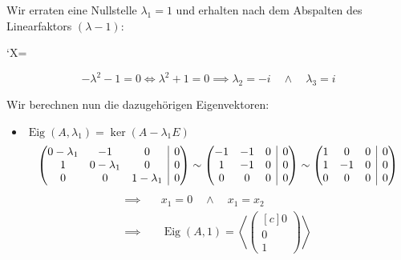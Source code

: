 \documentclass[answers]{exam}
\makeatletter
\newenvironment{sysmatrix}[1]
  {\left(\begin{array}{@{}#1@{}}}
  {\end{array}\right)}
\newcommand{\scalarprod}[1]{\left\langle #1 \right\rangle}
\newcommand{\vektor}[1]{\begin{pmatrix*}[c] #1 \end{pmatrix*}}
\newcommand{\Eig}{\operatorname{Eig}}
\makeatother
\begin{document}
\begin{questions}
\begin{parts}
\begin{solution}
            Wir erraten eine Nullstelle $\lambda_1 = 1$ und erhalten nach dem Abspalten des Linearfaktors $(\lambda-1)$:

            \vspace{1em}
            \begin{center}
                \begingroup\mathcode`X=\lambda
                \endgroup
            \end{center}

            $$
                -\lambda^2-1 = 0 \iff \lambda^2 + 1 = 0 \implies \lambda_2 = -i \quad \land \quad \lambda_3 = i
            $$

            Wir berechnen nun die dazugehörigen Eigenvektoren:
            \begin{itemize}
                \item $\Eig(A, \lambda_1) = \ker(A-\lambda_1 E)$
                      $$
                          \begin{sysmatrix}{ccc|c}
                              0 -\lambda_1 & -1 & 0 & 0 \\
                              1 & 0 -\lambda_1  & 0 & 0 \\
                              0 & 0 & 1 -\lambda_1  & 0
                          \end{sysmatrix}
                          \sim
                          \begin{sysmatrix}{ccc|c}
                              -1 & -1 & 0 & 0 \\
                              1 & -1  & 0 & 0 \\
                              0 & 0 & 0  & 0
                          \end{sysmatrix}
                          \sim
                          \begin{sysmatrix}{ccc|c}
                              1 & 0 & 0 & 0 \\
                              1 & -1  & 0 & 0 \\
                              0 & 0 & 0  & 0
                          \end{sysmatrix}
                      $$
                      $$
                          \begin{aligned}
                              \implies & \quad x_1 = 0 \quad \land \quad x_1 = x_2 \\
                              \implies & \quad \Eig(A, 1) = \scalarprod{\vektor{0  \\0\\1}}

\end{aligned}$$
\end{itemize}
\end{solution}
\end{parts}
\end{questions}
\end{document}
